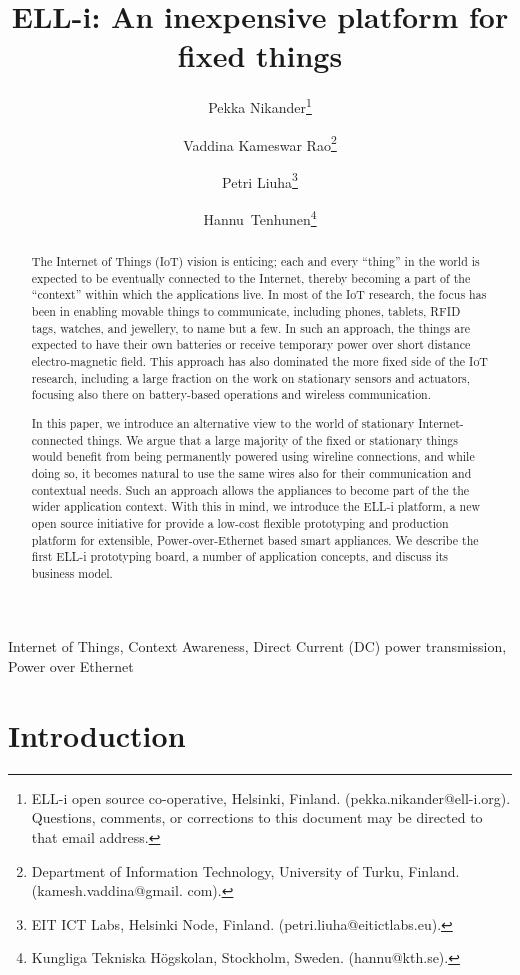 \documentclass{siamltex}
\title{{ELL-i}: An inexpensive platform for fixed things}
\author{Pekka Nikander\thanks{{ELL-i} open source co-operative,
    Helsinki, Finland. (pekka.nikander@ell-i.org).  Questions, comments,
    or corrections to this document may be directed to that email
    address.}
  \and Vaddina Kameswar Rao\thanks{Department of Information
    Technology, University of Turku, Finland. (kamesh.vaddina@gmail. com).}
  \and Petri Liuha\thanks{EIT ICT Labs, Helsinki Node,
    Finland. (petri.liuha@eitictlabs.eu).}
  \and \hbox{Hannu Tenhunen}\thanks{Kungliga Tekniska H\"{o}gskolan,
    Stockholm, Sweden. (hannu@kth.se).}}
\begin{document}
\maketitle

\begin{abstract}
The Internet of Things (IoT) vision is enticing; each and every
``thing'' in the world is expected to be eventually connected to the
Internet, thereby becoming a part of the ``context'' within which the
applications live.  
In most of the IoT research, the focus has been in enabling
movable things to communicate, including phones, tablets, RFID tags,
watches, and jewellery, to name but a few.  In such an approach, the
things are expected to have their own batteries or receive temporary
power over short distance electro-magnetic field.
This approach has also dominated the more fixed side of the
IoT research, including a large fraction on the work on stationary
sensors and actuators, focusing also there on battery-based operations
and wireless communication. 

In this paper, we introduce an alternative view to the world
of stationary Internet-connected things.  
We argue that a large majority of the fixed or
stationary things would benefit from being permanently powered using
wireline connections, and while doing so, it becomes natural to use
the same wires also for their communication and contextual needs.
Such an approach allows the appliances to become part of the
the wider application context.  With this in mind,
we introduce the
ELL-i platform, a new open source initiative for provide a low-cost
flexible prototyping and production platform for extensible,
Power-over-Ethernet based smart appliances.  We describe the first
ELL-i prototyping board,
a number of application concepts, and discuss its
business model. 
\end{abstract}

\begin{keywords} 
Internet of Things, Context Awareness, Direct Current (DC) power
transmission, Power over Ethernet
\end{keywords}

\pagestyle{myheadings}
\thispagestyle{plain}


\section{Introduction}
\end{document}
